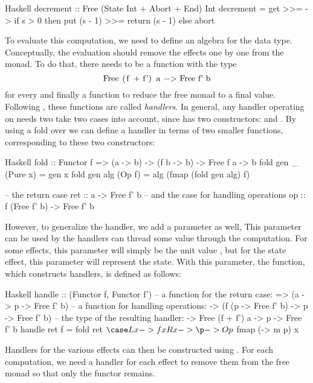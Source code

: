 \begin{lst}{Haskell}
decrement :: Free (State Int + Abort + End) Int
decrement = get >>= \s ->
              if s > 0
              then put (s - 1) >>= return (s - 1)
              else abort 
\end{lst}
%
To evaluate this computation, we need to define an algebra for the  data type. Conceptually, the evaluation should remove the effects one by one from the monad. To do that, there needs to be a function with the type
\[\mcode{Free (f + f') a -> Free f' b}\]
for every  and finally a function  to reduce the free monad to a final value. Following \textcite{castagna_handlers_2009}, these functions are called \emph{handlers}. In general, any handler operating on  needs two take two cases into account, since  has two constructors:  and . By using a fold over  we can define a handler in terms of two smaller functions, corresponding to these two constructors:
\begin{lst}{Haskell}
fold :: Functor f => (a -> b) -> (f b -> b) -> Free f a -> b
fold gen _   (Pure x) = gen x
fold gen alg (Op f)   = alg (fmap (fold gen alg) f)

-- the return case
ret :: a -> Free f' b
-- and the case for handling operations
op  :: f (Free f' b) -> Free f' b
\end{lst}
However, to generalize the handler, we add a parameter  as well, This parameter can be used by the handlers can thread some value through the computation. For some effects, this parameter will simply be the unit value \hs{()}, but for the state effect, this parameter will represent the state. With this parameter, the  function, which constructs handlers, is defined as follows:

\begin{lst}{Haskell}
handle :: (Functor f, Functor f')
          -- a function for the return case:
       => (a -> p -> Free f' b)
          -- a function for handling operations:
       -> (f (p -> Free f' b) -> p -> Free f' b)
          -- the type of the resulting handler: 
       -> Free (f + f') a -> p -> Free f' b
handle ret f = fold ret $
  \case
    L x -> f x
    R x -> \p -> Op $ fmap (\m -> m p) x
\end{lst}
%
Handlers for the various effects can then be constructed using . For each computation, we need a handler for each effect to remove them from the free monad so that only the  functor remains.


